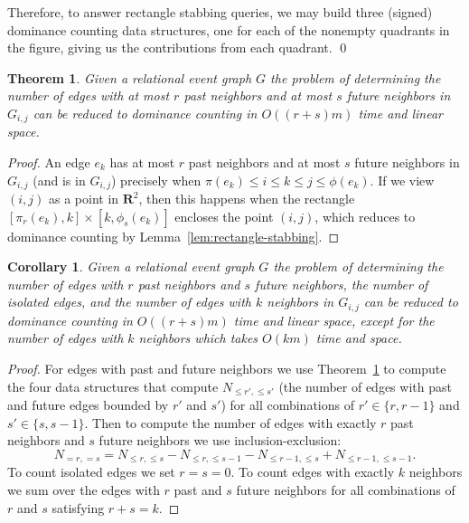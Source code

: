 \documentclass[11pt]{article}
\newcommand{\Real}{\mathbf{R}}
\newtheorem{theorem}{Theorem}
\newtheorem{corollary}{Corollary}
\begin{document}
Therefore, to answer rectangle stabbing queries, we may build three (signed) dominance counting data structures,  one for each of the nonempty quadrants in the figure, giving us the contributions from each quadrant. \qed

\begin{theorem}\label{thm:future-past}
Given a relational event graph $G$ the problem of determining the number of edges with at most $r$ past neighbors and at most $s$ future neighbors in $G_{i,j}$ can be reduced to dominance counting in $O((r+s)m)$ time and linear space.
\end{theorem}
\begin{proof}
An edge $e_k$ has at most $r$ past neighbors and at most $s$ future neighbors in $G_{i,j}$ (and is in $G_{i,j}$) precisely when $\pi(e_k) \leq i \leq k \leq j \leq \phi(e_k)$.
If we view $(i, j)$ as a point in $\Real^2$, then this happens when the rectangle $[\pi_r(e_k), k] \times [k, \phi_s(e_k)]$ encloses the point $(i, j)$, which reduces to dominance counting by Lemma~\ref{lem:rectangle-stabbing}.
\end{proof}


\begin{corollary}
Given a relational event graph $G$ the problem of determining the number of edges with $r$ past neighbors and $s$ future neighbors, the number of isolated edges, and the number of edges with $k$ neighbors in $G_{i,j}$ can be reduced to dominance counting in $O((r+s)m)$ time and linear space, except for the number of edges with $k$ neighbors which takes $O(km)$ time and space.
\end{corollary}
\begin{proof}
For edges with past and future neighbors we use Theorem~\ref{thm:future-past} to compute the four data structures that compute $N_{\le r', \le s'}$ (the number of edges with past and future edges bounded by $r'$ and $s'$) for all combinations of $r' \in\{ r, r-1\}$ and $s' \in\{ s,s-1\}$. Then to compute the number of edges with exactly $r$ past neighbors and $s$ future neighbors we use inclusion-exclusion:
\[
N_{=r,=s}=N_{\le r, \le s} - N_{\le r, \le s-1} - N_{\le r-1, \le s} + N_{\le r-1, \le s-1}.
\]
To count isolated edges we set $r=s=0$. To count edges with exactly $k$ neighbors we sum over the edges with $r$ past and $s$ future neighbors for all combinations of $r$ and $s$ satisfying $r+s = k$.
\end{proof}
\end{document}
